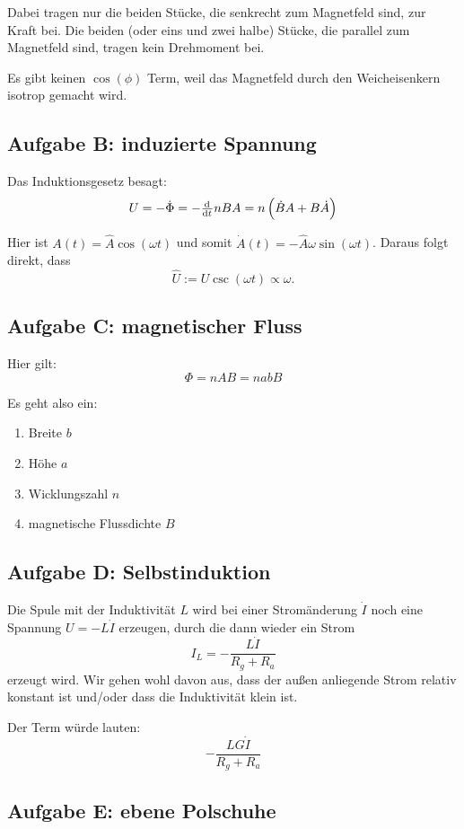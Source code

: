\documentclass[11pt, ngerman]{article}
\begin{document}
Dabei tragen nur die beiden Stücke, die senkrecht zum Magnetfeld sind, zur
Kraft bei. Die beiden (oder eins und zwei halbe) Stücke, die parallel zum
Magnetfeld sind, tragen kein Drehmoment bei.

Es gibt keinen $\cos(\phi)$ Term, weil das Magnetfeld durch den Weicheisenkern
isotrop gemacht wird.

\subsection{Aufgabe B: induzierte Spannung}

Das Induktionsgesetz besagt:
\[ U = - \dot \Phi = - \od{}{t} n B A = n \left( \dot B A + B \dot A \right) \]

Hier ist \( A(t) = \hat A \cos(\omega t) \) und somit \( \dot A(t) = - \hat A
\omega \sin(\omega t) \). Daraus folgt direkt, dass
\[
	\hat U := U \csc(\omega t) \propto \omega.
\]

\subsection{Aufgabe C: magnetischer Fluss}

Hier gilt:
\[ \Phi = n A B = n a b B \]

Es geht also ein:

\begin{enumerate}
	\item Breite $b$
	\item Höhe $a$
	\item Wicklungszahl $n$
	\item magnetische Flussdichte $B$
\end{enumerate}

\subsection{Aufgabe D: Selbstinduktion}

Die Spule mit der Induktivität $L$ wird bei einer Stromänderung $\dot I$ noch
eine Spannung $U = - L \dot I$ erzeugen, durch die dann wieder ein Strom \[ I_L
= - \frac{L \dot I}{R_g + R_a} \] erzeugt wird. Wir gehen wohl davon aus, dass
der außen anliegende Strom relativ konstant ist und/oder dass die Induktivität
klein ist.

Der Term würde lauten:
\[ - \frac{L G \dot I}{R_g + R_a} \]

\subsection{Aufgabe E: ebene Polschuhe}
\end{document}

